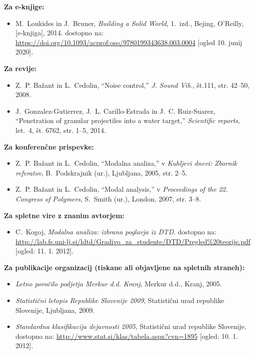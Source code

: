 \textbf{Za e-knjige:}
\begin{itemize}
\item[{[4]}] M.~Loukides in J.~Bruner, \emph{Building a Solid World}, 1.~izd., 
Bejing, O'Reilly, [e-knjiga], 2014. dostopno na:
\url{https://doi.org/10.1093/acprof:oso/9780199343638.003.0004} [ogled 10.
junij 2020].
\end{itemize}

\textbf{Za revije:}
\begin{itemize}
\item[{[5]}] Z.~P. Ba\v{z}ant in L.~Cedolin, ``Noise control,'' \emph{J. Sound 
Vib.}, št.111, str. 42--50, 2008.\\
\item[{[6]}] J.~Gonzalez-Gutierrez, J.~L. Carillo-Estrada in J.~C. Ruiz-Suarez,
``Penetration of granular projectiles into a water target,'' \emph{Scientific
reports}, let.~4, št. 6762, str. 1--5, 2014.
\end{itemize}

\textbf{Za konferenčne prispevke:}
\begin{itemize}
\item[{[7]}] Z.~P. Ba\v{z}ant in L.~Cedolin, ``Modalna analiza,'' v 
\emph{Kuhljevi dnevi: Zbornik referatov}, B.~Podskrajnik (ur.), Ljubljana, 
2005, str. 2--5.\\

\item[{[8]}] Z.~P. Ba\v{z}ant in L.~Cedolin, ``Modal analysis,'' v 
\emph{Proceedings of the 22. Congress of Polymers}, S.~Smith (ur.), London, 
2007, str. 3--8.\\
\end{itemize}

\textbf{Za spletne vire z znanim avtorjem:}
\begin{itemize}
\item[{[9]}]C.~Kogoj, \emph{Modalna analiza: izbrana poglavja iz {DTD}}. 
dostopno na: 
\url{http://lab.fs.uni-lj.si/ldtd/Gradivo_za_studente/DTD/Pregled\%20teorije.pdf}
	[ogled: 11. 1. 2012].
\end{itemize}

\textbf{Za publikacije organizacij (tiskane ali objavljene na spletnih 
straneh):}
\begin{itemize}
\item[{[10]}] \emph{Letno poročilo podjetja {M}erkur d.d. {K}ranj}, {Merkur 
d.d., Kranj}, 2005.\\

\item[{[11]}] \emph{{Statistični letopis Republike Slovenije 2009}}, 
Statistični urad republike Slovenije, Ljubljana, 2009.\\

\item[{[12]}]\emph{Standardna klasifikacija dejavnosti 2005}, {Statistični urad 
republike Slovenije}. dostopno na: 
\url{http://www.stat.si/klas/tabela.aspx?cvn=1895}
[ogled: 10. 1. 2012].
\end{itemize}

